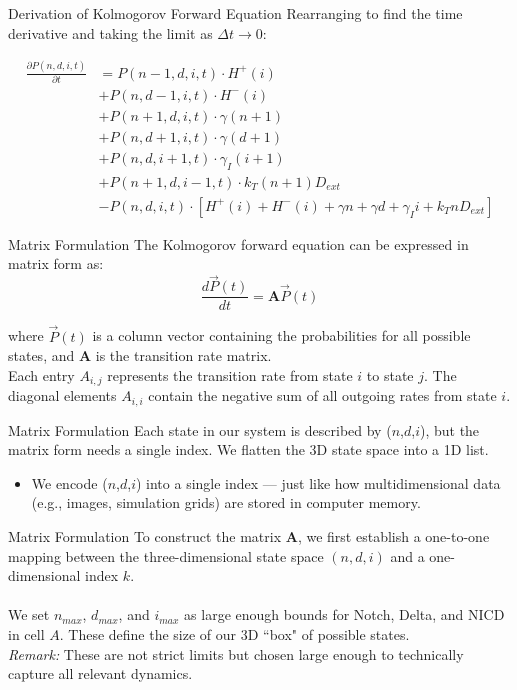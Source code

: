 \documentclass[aspectratio=169]{beamer}
\begin{document}
\begin{frame}{Derivation of Kolmogorov Forward Equation}
Rearranging to find the time derivative and taking the limit as $\Delta t \rightarrow 0$:

\begin{align*}
\frac{\partial P(n,d,i,t)}{\partial t} &= P(n-1,d,i,t) \cdot H^+(i) \\
&+ P(n,d-1,i,t) \cdot H^-(i) \\
&+ P(n+1,d,i,t) \cdot \gamma(n+1) \\
&+ P(n,d+1,i,t) \cdot \gamma(d+1) \\
&+ P(n,d,i+1,t) \cdot \gamma_I(i+1) \\
&+ P(n+1,d,i-1,t) \cdot k_T(n+1)D_{ext} \\
&- P(n,d,i,t) \cdot [H^+(i) + H^-(i) + \gamma n + \gamma d + \gamma_I i + k_T n D_{ext}]
\end{align*}

\end{frame}

\begin{frame}{Matrix Formulation}
The Kolmogorov forward equation can be expressed in matrix form as:
\[
\frac{d\vec{P}(t)}{dt} = \mathbf{A} \vec{P}(t)
\]

where $\vec{P}(t)$ is a column vector containing the probabilities for all possible states, and $\mathbf{A}$ is the transition rate matrix.\\
Each entry $A_{i,j}$ represents the transition rate from state $i$ to state $j$. The diagonal elements $A_{i,i}$ contain the negative sum of all outgoing rates from state $i$.

\end{frame}

\begin{frame}{Matrix Formulation}
Each state in our system is described by ($n$,$d$,$i$), but the matrix form needs a single index.
\vfill
\pause
We flatten the 3D state space into a 1D list.\\
\begin{itemize}
    \item We encode ($n$,$d$,$i$) into a single index — just like how multidimensional data (e.g., images, simulation grids) are stored in computer memory.
\end{itemize}
\end{frame}

\begin{frame}{Matrix Formulation}
To construct the matrix $\mathbf{A}$, we first establish a one-to-one mapping between the three-dimensional state space $(n,d,i)$ and a one-dimensional index $k$. \\~\\

We set $n_{max}$, $d_{max}$, and $i_{max}$ as large enough bounds for Notch, Delta, and NICD in cell $A$. These define the size of our 3D ``box" of possible states. \\
\textit{Remark:} These are not strict limits but chosen large enough to technically capture all relevant dynamics.
\end{frame}
\end{document}
